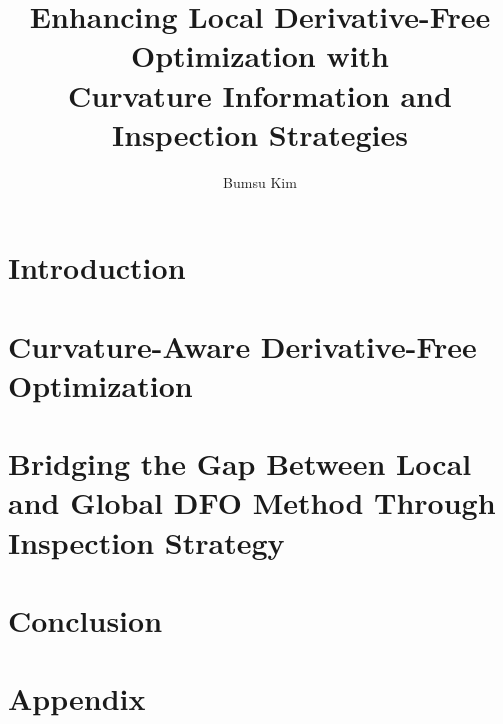\documentclass [PhD] {uclathes}
\title          {Enhancing Local Derivative-Free Optimization with\\ Curvature Information and Inspection Strategies}
\author         {Bumsu Kim}
\begin{document}
\makeintropages
%
%

\chapter{Introduction}



\chapter{Curvature-Aware Derivative-Free Optimization}


\chapter{Bridging the Gap Between Local and Global DFO Method Through Inspection Strategy}


\chapter{Conclusion}


\appendix
\chapter{Appendix}




\end{document}
